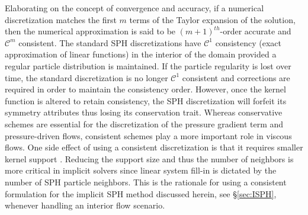 Elaborating on the concept of convergence and accuracy, if a numerical discretization matches the first $m$ terms of the Taylor expansion of the solution, then the numerical approximation
is said to be $(m + 1)^{th}$-order accurate and $\mathcal{C}^m$ consistent. The standard SPH discretizations have $\mathcal{C}^1$  consistency (exact approximation of linear functions) in the interior of the domain provided a regular particle distribution is maintained. If the particle regularity is lost over time, the standard discretization is no longer $\mathcal{C}^1$ consistent and corrections are required in order to maintain the consistency order. However, once the kernel function is altered to retain consistency, the SPH discretization will forfeit its symmetry attributes thus losing its conservation trait. Whereas conservative schemes are essential for the discretization of the pressure gradient term and pressure-driven flows, consistent schemes play a more important role in viscous flows. One side effect of using a consistent discretization is that it requires smaller kernel support \cite{Trask2015,islam2018consistency}. Reducing the support size and thus the number of neighbors is more critical in implicit solvers since linear system fill-in is dictated by the number of SPH particle neighbors. This is the rationale for using a consistent formulation for the implicit SPH method discussed herein, see \S\ref{sec:ISPH}, whenever handling an interior flow scenario.


